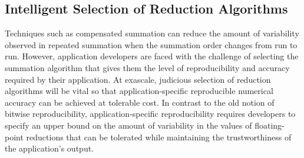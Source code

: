 \subsection{Intelligent Selection of Reduction Algorithms} 

Techniques such as compensated summation can reduce the amount of
variability observed in repeated summation when the summation order
changes from run to run. However, application developers are faced
with the challenge of selecting the summation algorithm that gives
them the level of reproducibility and accuracy required by their
application. At exascale, judicious selection of reduction algorithms
will be vital so that application-specific reproducible numerical
accuracy can be achieved at tolerable cost. In contrast to the old
notion of bitwise reproducibility, application-specific
reproducibility requires developers to specify an upper bound on the
amount of variability in the values of floating-point reductions that
can be tolerated while maintaining the trustworthiness of the
application's output.

